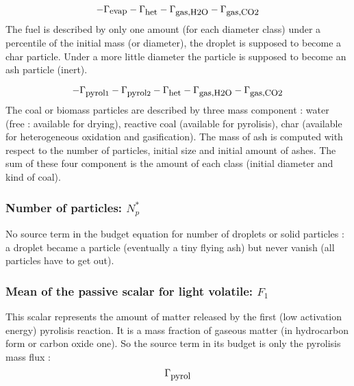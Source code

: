 \begin{equation}
     -\Gamma_{\mbox{\small evap}}-\Gamma_{\mbox{\small het}}-\Gamma_{\mbox{\small gas,H2O}}-\Gamma_{\mbox{\small gas,CO2}}
\end{equation}
The fuel is described by only one amount (for each diameter class) under a
percentile of the initial mass (or diameter), the droplet is supposed to become
a char particle. Under a more little diameter the particle is supposed to become
an ash particle (inert).

\begin{equation}
     -\Gamma_{\mbox{\small pyrol}1}-\Gamma_{\mbox{\small pyrol}2}-\Gamma_{\mbox{\small het}}-\Gamma_{\mbox{\small gas,H2O}}-\Gamma_{\mbox{\small gas,CO2}}
\end{equation}
The coal or biomass particles are described by three mass component : water
(free : available for drying), reactive coal (available for pyrolisis), char
(available for heterogeneous oxidation and gasification). The mass of ash is
computed with respect to the number of particles, initial size and initial
amount of ashes. The sum of these four component is the amount of each class
(initial diameter and kind of coal).
          
\subsubsection{Number of particles: $N_{p}^{*}$}
No source term in the budget equation for number of droplets or solid particles
: a droplet became a particle (eventually a tiny flying ash) but never vanish
(all particles have to get out).

                                
\subsubsection{Mean of the passive scalar for light volatile: $F_{1}$}  

This scalar represents the amount of matter released by the first (low
activation energy) pyrolisis reaction. It is a mass fraction of gaseous matter
(in hydrocarbon form or carbon oxide one). So the source term in its budget is
only the pyrolisis mass flux :
\begin{equation}
    \Gamma _{\mbox{\small pyrol}}
\end{equation}
